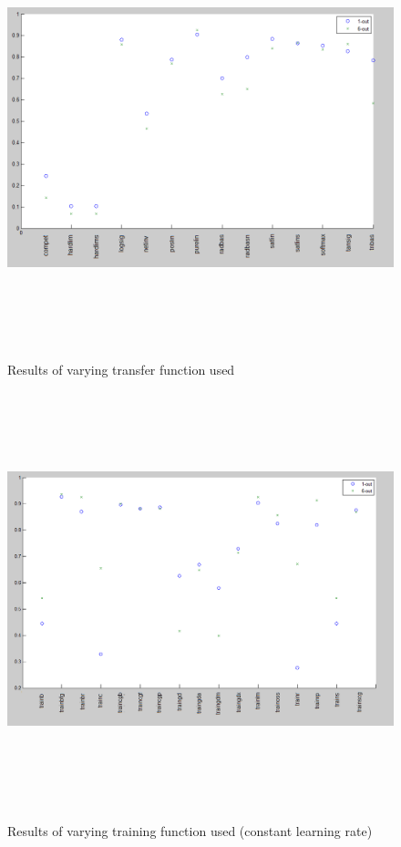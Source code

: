 \documentclass[a4paper]{article}
\begin{document}
\begin{landscape}
\begin{figure}[p]
  \centering
  {\includegraphics[height=120mm]{transfer-function.png}}
  \caption{Results of varying transfer function used}
\end{figure}

\begin{figure}[p]
  \centering
  {\includegraphics[height=120mm]{training-function.png}}
  \caption{Results of varying training function used (constant learning rate)}
\end{figure}
\end{landscape}
\end{document}
